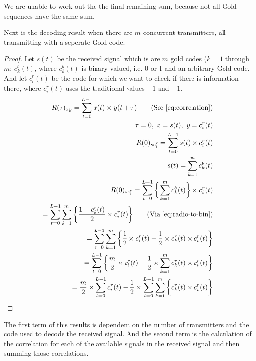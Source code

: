 		We are unable to work out the the final remaining sum, because not all Gold sequences have the same sum.

		Next is the decoding result when there are $m$ concurrent transmitters, all transmitting with a seperate Gold code.


		\begin{proof}
			Let $s(t)$ be the received signal which is are $m$ gold codes ($k = 1$ through $m$: $c^b_k(t)$, where $c^b_k(t)$ is binary valued, i.e. $0$ or $1$ and an arbitrary Gold code.\\
			And let $c^r_i(t)$ be the code for which we want to check if there is information there, where $c^r_i(t)$ uses the traditional values $-1$ and $+1$. \\

			\begin{align*}
				R(\tau)_{xy} = \displaystyle\sum_{t = 0} ^ {L - 1} x(t) \times y(t + \tau)	\tag{See \autoref{eq:correlation}}
				\\ \tau = 0,\ x = s(t),\ y = c^r_i(t)	
				\\ R(0)_{sc^r_{i}} = \displaystyle\sum_{t = 0} ^ {L - 1} s(t) \times c^r_i(t)	
				\\ s(t) = \displaystyle\sum_{k = 1} ^ {m} c^b_k(t)						
				\\ R(0)_{sc^r_{i}} = \displaystyle\sum_{t = 0} ^ {L - 1} \bigg\{ \displaystyle\sum_{k = 1} ^ {m} c^b_k(t) \bigg\} \times c^r_i(t)
				\\ = \displaystyle\sum_{t = 0} ^ {L - 1} \displaystyle\sum_{k = 1} ^ {m} \bigg\{ \frac{1 - c^r_k(t)}{2} \times c^r_i(t) \bigg\} \tag{Via \autoref{eq:radio-to-bin}}
				\\ = \displaystyle\sum_{t = 0} ^ {L - 1} \displaystyle\sum_{k = 1} ^ {m} \bigg\{ \frac{1}{2} \times c^r_i(t) - \frac{1}{2} \times c^r_k(t) \times c^r_i(t) \bigg\} 
				\\ = \displaystyle\sum_{t = 0} ^ {L - 1} \bigg\{ \frac{m}{2} \times c^r_i(t) - \frac{1}{2} \times \displaystyle\sum_{k = 1} ^ {m} c^r_k(t) \times c^r_i(t) \bigg\} 
				\\ = \frac{m}{2} \times \displaystyle\sum_{t = 0} ^ {L - 1} c^r_i(t) - \frac{1}{2} \times \displaystyle\sum_{t = 0} ^ {L - 1} \displaystyle\sum_{k = 1} ^ {m} \bigg\{ c^r_k(t) \times c^r_i(t) \bigg\}
			\end{align*}

		\end{proof}

		The first term of this results is dependent on the number of transmitters and the code used to decode the received signal.
		And the second term is the calculation of the correlation for each of the available signals in the received signal and then summing those correlations.

